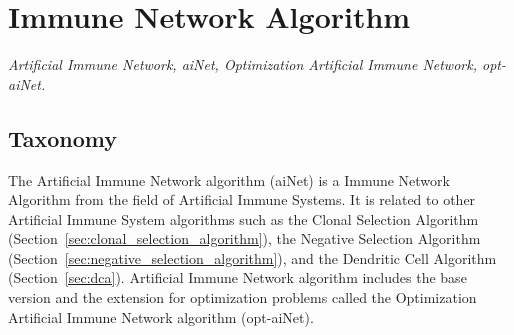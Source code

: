 

\section{Immune Network Algorithm} 
\label{sec:immune_network_algorithm}

\emph{Artificial Immune Network, aiNet, Optimization Artificial Immune Network, opt-aiNet.}

\subsection{Taxonomy}
The Artificial Immune Network algorithm (aiNet) is a Immune Network Algorithm from the field of Artificial Immune Systems.
It is related to other Artificial Immune System algorithms such as the Clonal Selection Algorithm (Section~\ref{sec:clonal_selection_algorithm}), the Negative Selection Algorithm (Section~\ref{sec:negative_selection_algorithm}), and the Dendritic Cell Algorithm (Section~\ref{sec:dca}).
Artificial Immune Network algorithm includes the base version and the extension for optimization problems called the Optimization Artificial Immune Network algorithm (opt-aiNet).

